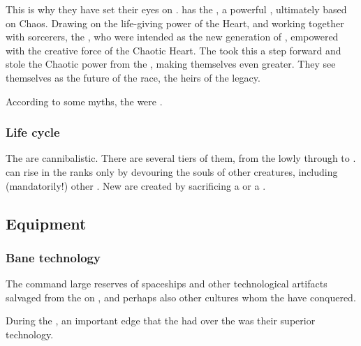 This is why they have set their eyes on \Miith{}. 
\Miith{} has the , a powerful \dweomer{}, ultimately based on Chaos. 
Drawing on the life-giving power of the Heart, and working together with  sorcerers,  the , who were intended as the new generation of \banes, empowered with the creative force of the Chaotic Heart. 
The  took this a step forward and stole the Chaotic \xzaishannic{} power from the \dragons, making themselves even greater. They see themselves as the future of the \bane{} race, the heirs of the \bane{} legacy.

According to some myths, the \banes were .





\subsubsection{Life cycle}
The \banes are cannibalistic. 
There are several tiers of them, from the lowly \banespawn{} through \lesserbanes{} to \banelords. 
\Banes{} can rise in the ranks only by devouring the souls of other creatures, including (mandatorily!) other \banes. 
New \banespawn{} are created by sacrificing a \lesserbane{} or a \banelord. 









\subsection{Equipment}





\subsubsection{Bane technology}
The \banes{} command large reserves of spaceships and other technological artifacts salvaged from the \voyagers{} on \Erebos, and perhaps also other cultures whom the \banes{} have conquered. 

During the , an important edge that the \banes{} had over the \Miithians was their superior technology. 

